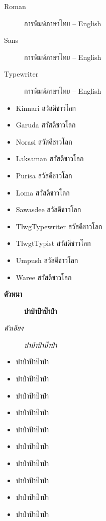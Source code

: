 \documentclass{article}
\begin{document}
\begin{description}
  \item[Roman]   การพิมพ์ภาษาไทย --  English
  \item[\sffamily{}Sans]  \sffamily  การพิมพ์ภาษาไทย -- English
  \item[\ttfamily{}Typewriter] \ttfamily  การพิมพ์ภาษาไทย -- English
\end{description}

\begin{itemize}
  \item \kinnari Kinnari สวัสดีชาวโลก
  \item \garuda Garuda สวัสดีชาวโลก
  \item \norasi Norasi สวัสดีชาวโลก
  \item \laksaman Laksaman สวัสดีชาวโลก
  \item \purisa Purisa สวัสดีชาวโลก
  \item \loma Loma สวัสดีชาวโลก
  \item \sawasdee Sawasdee สวัสดีชาวโลก
  \item \tlwgtypewriter TlwgTypewriter สวัสดีชาวโลก
  \item \tlwgtypist TlwgtTypist สวัสดีชาวโลก
  \item \umpush Umpush สวัสดีชาวโลก
  \item \waree Waree สวัสดีชาวโลก
\end{itemize}

\begin{description}
  \item[\textbf{ตัวหนา}]  \bfseries ปาป่าป้าป๊าป๋า
  \item[\textit{ตัวเอียง}]  \itshape ปาป่าป้าป๊าป๋า
\end{description}


\begin{itemize}
  \item {}\selectfont ปาป่าป้าป๊าป๋า
  \item {}\selectfont ปาป่าป้าป๊าป๋า
  \item {}\selectfont ปาป่าป้าป๊าป๋า
  \item {}\selectfont ปาป่าป้าป๊าป๋า
\end{itemize}

\begin{itemize}
  \item \umpush{}\selectfont ปาป่าป้าป๊าป๋า
  \item \umpush{}\selectfont ปาป่าป้าป๊าป๋า
  \item \umpush{}\selectfont ปาป่าป้าป๊าป๋า
  \item \umpush{}\selectfont ปาป่าป้าป๊าป๋า
  \item \umpush{}\selectfont ปาป่าป้าป๊าป๋า
  \item \umpush{}\selectfont ปาป่าป้าป๊าป๋า
\end{itemize}
\end{document}
